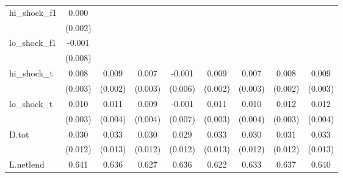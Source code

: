 {\begin{tabular}{l*{8}{c}}
\addlinespace
hi\_shock\_f1 &       0.000         &                     &                     &                     &                     &                     &                     &                     \\
            &     (0.002)         &                     &                     &                     &                     &                     &                     &                     \\
\addlinespace
lo\_shock\_f1 &      -0.001         &                     &                     &                     &                     &                     &                     &                     \\
            &     (0.008)         &                     &                     &                     &                     &                     &                     &                     \\
\addlinespace
hi\_shock\_t  &       0.008\sym{***}&       0.009\sym{***}&       0.007\sym{**} &      -0.001         &       0.009\sym{***}&       0.007\sym{**} &       0.008\sym{***}&       0.009\sym{***}\\
            &     (0.003)         &     (0.002)         &     (0.003)         &     (0.006)         &     (0.002)         &     (0.003)         &     (0.002)         &     (0.003)         \\
\addlinespace
lo\_shock\_t  &       0.010\sym{***}&       0.011\sym{***}&       0.009\sym{**} &      -0.001         &       0.011\sym{***}&       0.010\sym{**} &       0.012\sym{***}&       0.012\sym{***}\\
            &     (0.003)         &     (0.004)         &     (0.004)         &     (0.007)         &     (0.003)         &     (0.004)         &     (0.003)         &     (0.004)         \\
\addlinespace
D.tot       &       0.030\sym{**} &       0.033\sym{**} &       0.030\sym{**} &       0.029\sym{**} &       0.033\sym{**} &       0.030\sym{**} &       0.031\sym{**} &       0.033\sym{**} \\
            &     (0.012)         &     (0.013)         &     (0.012)         &     (0.012)         &     (0.013)         &     (0.012)         &     (0.012)         &     (0.013)         \\
\addlinespace
L.netlend   &       0.641\sym{***}&       0.636\sym{***}&       0.627\sym{***}&       0.636\sym{***}&       0.622\sym{***}&       0.633\sym{***}&       0.637\sym{***}&       0.640\sym{***}\\

\end{tabular}}
